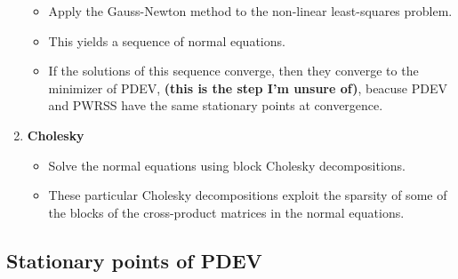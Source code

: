 \documentclass{jss}
\begin{document}
\begin{enumerate}
  \begin{itemize}
    \item Apply the Gauss-Newton method to the non-linear
      least-squares problem.
    \item This yields a sequence of normal equations.
    \item If the solutions of this sequence converge, then they
      converge to the minimizer of PDEV, \textbf{(this is the step I'm
        unsure of)}, beacuse PDEV and PWRSS have the same stationary
      points at convergence.
  \end{itemize}
\item \textbf{Cholesky}
  \begin{itemize}
    \item Solve the normal equations using block Cholesky
      decompositions.
    \item These particular Cholesky decompositions exploit the sparsity
      of some of the blocks of the cross-product matrices in the
      normal equations.
  \end{itemize}
\end{enumerate}

\subsection{Stationary points of PDEV}
\end{document}
